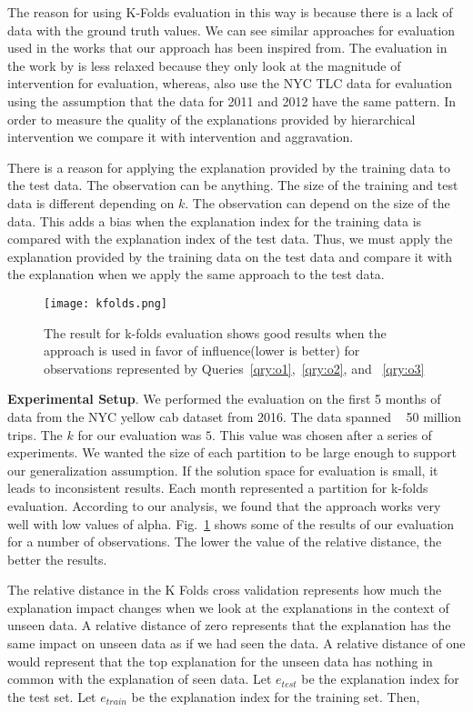 The reason for using K-Folds evaluation in this way is because there is a lack of data with the ground truth values. We can see similar approaches for evaluation used in the works that our approach has been inspired from. The evaluation in the work by \cite{roy2014formal} is less relaxed because they only look at the magnitude of intervention for evaluation, whereas, \cite{chirigati2016data} also use the NYC TLC data for evaluation using the assumption that the data for 2011 and 2012 have the same pattern. In order to measure the quality of the explanations provided by hierarchical intervention we compare it with intervention and aggravation.

There is a reason for applying the explanation provided by the training data to the test data. The observation can be anything. The size of the training and test data is different depending on $k$. The observation can depend on the size of the data. This adds a bias when the explanation index for the training data is compared with the explanation index of the test data. Thus, we must apply the explanation provided by the training data on the test data and compare it with the explanation when we apply the same approach to the test data.

\begin{figure}[h]
\texttt{[image: kfolds.png]}
\caption{The result for k-folds evaluation shows good results when the approach is used in favor of influence(lower is better) for observations represented by Queries~\ref{qry:o1},~\ref{qry:o2}, and ~\ref{qry:o3}}
\label{fig:kfolds}
\end{figure}

\textbf{Experimental Setup}. We performed the evaluation on the first 5 months of data from the NYC yellow cab dataset from 2016. The data spanned ~ 50 million trips. The $k$ for our evaluation was $5$. This value was chosen after a series of experiments. We wanted the size of each partition to be large enough to support our generalization assumption. If the solution space for evaluation is small, it leads to inconsistent results. Each month represented a partition for k-folds evaluation. According to our analysis, we found that the approach works very well with low values of alpha. Fig.~\ref{fig:kfolds} shows some of the results of our evaluation for a number of observations. The lower the value of the relative distance, the better the results.

The relative distance in the K Folds cross validation represents how much the explanation impact changes when we look at the explanations in the context of unseen data. A relative distance of zero represents that the explanation has the same impact on unseen data as if we had seen the data. A relative distance of one would represent that the top explanation for the unseen data has nothing in common with the explanation of seen data. Let $e_{test}$ be the explanation index for the test set. Let $e_{train}$ be the explanation index for the training set. Then,

